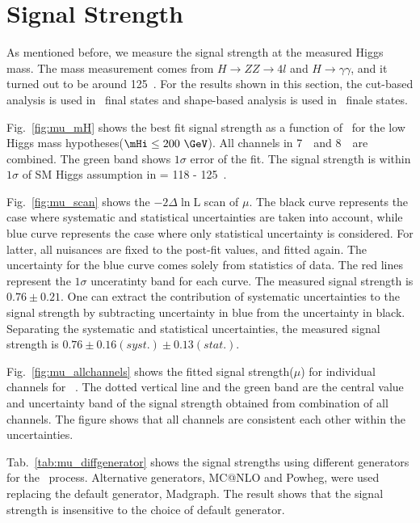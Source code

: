 \section{Signal Strength}

As mentioned before, we measure the signal strength at the 
measured Higgs mass. The mass measurement comes from 
$H\rightarrow ZZ\rightarrow4l$ and $H\rightarrow \gamma\gamma$, 
and it turned out to be around 125~\GeV. 
For the results shown in this section,   
the cut-based analysis is used in \SF\ final states 
and shape-based analysis is used in \DF\ finale states. 

Fig.~\ref{fig:mu_mH} shows the best fit signal strength 
as a function of \mHi\ for the low Higgs mass hypotheses($\mHi\le200~\GeV$).
All channels in 7~\TeV\ and 8~\TeV\ are combined. 
The green band shows $1\sigma$ error of the fit. 
The signal strength is within $1\sigma$ of SM Higgs assumption 
in \mHi = 118 - 125~\GeV.  

Fig.~\ref{fig:mu_scan} shows the  $- 2\Delta\ln \textrm{L}$ scan of $\mu$. 
The black curve represents the case where systematic and statistical 
uncertainties are taken into account, while blue curve represents the case 
where only statistical uncertainty is considered. For latter,  
all nuisances are fixed to the post-fit values, and fitted again.  
The uncertainty for the blue curve comes solely from statistics of data. 
The red lines represent the $1\sigma$ unceratinty band for each curve. 
The measured signal strength is $0.76 \pm 0.21$.  
One can extract the contribution of systematic uncertainties to the signal strength
by subtracting uncertainty in blue from the uncertainty in black.
Separating the systematic and statistical uncertainties, 
the measured signal strength is $0.76 \pm 0.16(syst.) \pm 0.13(stat.)$.  

Fig.~\ref{fig:mu_allchannels} shows the fitted signal strength($\mu$) 
for individual channels for ~\GeV.
The dotted vertical line and the green band are 
the central value and uncertainty band of the signal strength 
obtained from combination of all channels. 
The figure shows that all channels are consistent each other
within the uncertainties.

Tab.~\ref{tab:mu_diffgenerator} shows the signal strengths 
using different generators for the \qqww\ process. Alternative generators,
MC@NLO and Powheg, were used replacing the default generator, Madgraph.
The result shows that the signal strength is insensitive to the choice
of default generator. 


